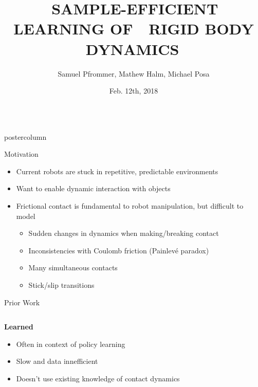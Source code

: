 \documentclass[final,hyperref={pdfpagelabels=false},5pt]{beamer}
\title{{\noindent  \,SAMPLE-EFFICIENT LEARNING OF \, \linebreak \,RIGID BODY DYNAMICS\, \linebreak} }
\author{Samuel Pfrommer, Mathew Halm, Michael Posa}
\institute[University of Pennsylvania]{DAIR Laboratory --- GRASP Laboratory --- University of Pennsylvania}
\date{Feb. 12th, 2018}
\newlength{\columnheight}
\begin{document}
\begin{frame}
  \vspace{-26ex}
    \begin{columns}
    \begin{column}{.49\textwidth}
      \begin{beamercolorbox}[center,wd=\textwidth]{postercolumn}
        \begin{minipage}[T]{.95\textwidth}  %
          \parbox[t][\columnheight]{\textwidth}{ %
            \begin{block}{Motivation}
              \color{penndkbl}
                    \begin{itemize}
                        \item Current robots are stuck in repetitive, predictable environments
                        \item Want to enable dynamic interaction with objects
                        \item Frictional contact is fundamental to robot manipulation, but difficult to model
                            \begin{itemize}
                                \item Sudden changes in dynamics when making/breaking contact 
                                \item Inconsistencies with Coulomb friction (Painlev\'{e} paradox)
                                \item Many simultaneous contacts
                                \item Stick/slip transitions
                            \end{itemize}
                    \end{itemize}
              \end{block}
                      
            \begin{block}{Prior Work}
                \begin{columns}[t]
                    \begin{column}{0.3\textwidth}
                        \textbf{Learned}
                        \begin{itemize}
                            \item Often in context of policy learning
                            \item Slow and data innefficient
                            \item Doesn't use existing knowledge of contact dynamics
                        \end{itemize}
                    \end{column}


\end{columns}
\end{block}}
\end{minipage}
\end{beamercolorbox}
\end{column}
\end{columns}
\end{frame}
\end{document}
